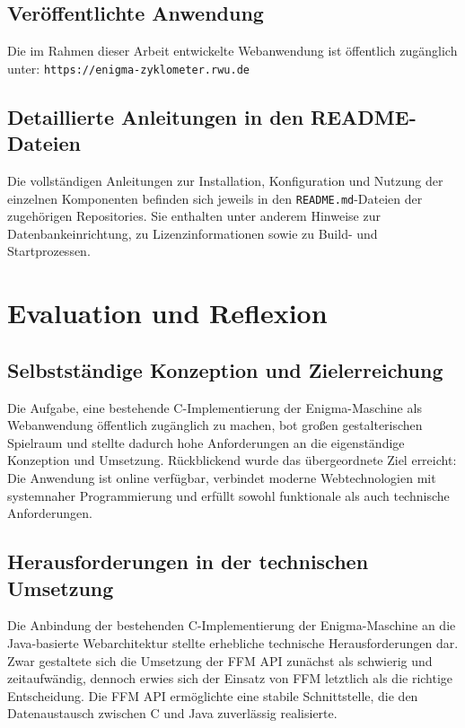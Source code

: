 \documentclass[12pt, ngerman, a4paper, numbers=noenddot]{article}
\begin{document}
\subsection{Veröffentlichte Anwendung}

Die im Rahmen dieser Arbeit entwickelte Webanwendung ist öffentlich zugänglich unter:  
\lstinline|https://enigma-zyklometer.rwu.de|

\subsection{Detaillierte Anleitungen in den README-Dateien}

Die vollständigen Anleitungen zur Installation, Konfiguration und Nutzung der einzelnen Komponenten befinden sich jeweils in den \lstinline|README.md|-Dateien der zugehörigen Repositories.  
Sie enthalten unter anderem Hinweise zur Datenbankeinrichtung, zu Lizenzinformationen sowie zu Build- und Startprozessen.  





\newpage
\section{Evaluation und Reflexion}

\subsection{Selbstständige Konzeption und Zielerreichung}

Die Aufgabe, eine bestehende C-Implementierung der Enigma-Maschine als Webanwendung öffentlich zugänglich zu machen, bot großen gestalterischen Spielraum und stellte dadurch hohe Anforderungen an die eigenständige Konzeption und Umsetzung. Rückblickend wurde das übergeordnete Ziel erreicht: Die Anwendung ist online verfügbar, verbindet moderne Webtechnologien mit systemnaher Programmierung und erfüllt sowohl funktionale als auch technische Anforderungen.

\subsection{Herausforderungen in der technischen Umsetzung}

Die Anbindung der bestehenden C-Implementierung der Enigma-Maschine an die Java-basierte Webarchitektur stellte erhebliche technische Herausforderungen dar. Zwar gestaltete sich die Umsetzung der FFM API zunächst als schwierig und zeitaufwändig, dennoch erwies sich der Einsatz von FFM letztlich als die richtige Entscheidung. Die FFM API ermöglichte eine stabile Schnittstelle, die den Datenaustausch zwischen C und Java zuverlässig realisierte.
\end{document}

